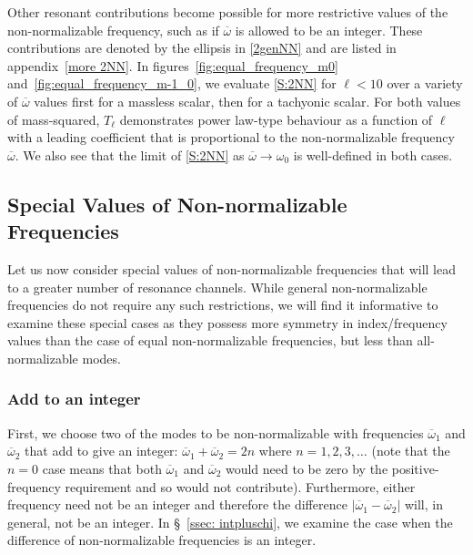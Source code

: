 \documentclass[../PhD.tex]{subfiles}
\newcommand{\oone}{\overline{\omega}_1}
\newcommand{\otwo}{\overline{\omega}_2}
\newcommand{\ob}{\overline{\omega}}
\begin{document}
Other resonant contributions become possible for more restrictive values of the non-normalizable frequency, such as if $\ob$ is allowed to be an integer. These contributions are denoted by the ellipsis in \eqref{2genNN} and are listed in appendix~\ref{more 2NN}. In figures~\ref{fig:equal_frequency_m0} and~\ref{fig:equal_frequency_m-1_0}, we evaluate \eqref{S:2NN} for $\ell < 10$ over a variety of $\ob$ values first for a massless scalar, then for a tachyonic scalar. For both values of mass-squared, $T_\ell$ demonstrates power law-type behaviour as a function of $\ell$ with a leading coefficient that is proportional to the non-normalizable frequency $\ob$. We also see that the limit of \eqref{S:2NN} as $\ob \to \omega_0$ is well-defined in both cases.

\subsection{Special Values of Non-normalizable Frequencies}

Let us now consider special values of non-normalizable frequencies that will lead to a greater number of resonance channels. While general non-normalizable frequencies do not require any such restrictions, we will find it informative to examine these special cases as they possess more symmetry in index/frequency values than the case of equal non-normalizable frequencies, but less than all-normalizable modes. 

\subsubsection{Add to an integer}
\label{ssec: add to integer}

First, we choose two of the modes to be non-normalizable with frequencies $\oone$ and $\otwo$ that add to give an integer: $\oone+ \otwo = 2n$ where $n = 1, 2, 3, \ldots$ (note that the $n = 0$ case means that both $\oone$ and $\otwo$ would need to be zero by the positive-frequency requirement and so would not contribute). Furthermore, either frequency need not be an integer and therefore the difference $|\oone - \otwo|$ will, in general, not be an integer. In \S\!~\ref{ssec: intpluschi}, we examine the case when the difference of non-normalizable frequencies is an integer.
\end{document}
